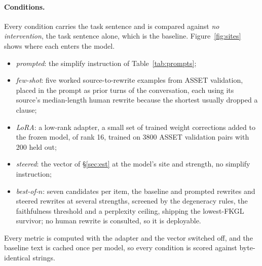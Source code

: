 \documentclass[aps,prb,reprint,nofootinbib,a4paper]{revtex4-2}
\begin{document}
\paragraph{Conditions.} Every condition carries the task sentence and is
compared against \emph{no intervention}, the task sentence alone, which is the
baseline. Figure~\ref{fig:sites} shows where each enters the model.
\begin{itemize}
\item \emph{prompted}: the simplify instruction of Table~\ref{tab:prompts};
\item \emph{few-shot}: five worked source-to-rewrite examples from ASSET
validation, placed in the prompt as prior turns of the conversation, each using
its source's median-length human rewrite because the shortest usually dropped
a clause;
\item \emph{LoRA}: a low-rank adapter, a small set of trained weight
corrections added to the frozen model, of rank 16, trained on 3800 ASSET
validation pairs with 200 held out;
\item \emph{steered}: the vector of \S\ref{sec:est} at the model's site and
strength, no simplify instruction;
\item \emph{best-of-$n$}: seven candidates per item, the baseline and prompted
rewrites and steered rewrites at several strengths, screened by the degeneracy
rules, the faithfulness threshold and a perplexity ceiling, shipping the
lowest-FKGL survivor; no human rewrite is consulted, so it is deployable.
\end{itemize}
Every metric is computed with the adapter and the vector switched off, and the
baseline text is cached once per model, so every condition is scored against
byte-identical strings.
\end{document}
